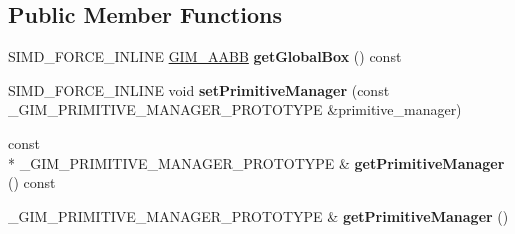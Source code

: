 \subsection*{Public Member Functions}
\begin{DoxyCompactItemize}
\item 
\hypertarget{class_g_i_m___b_o_x___t_r_e_e___t_e_m_p_l_a_t_e___s_e_t_a3a9763f3f80779ca066ffe3eb449f2a5}{S\+I\+M\+D\+\_\+\+F\+O\+R\+C\+E\+\_\+\+I\+N\+L\+I\+N\+E \hyperlink{class_g_i_m___a_a_b_b}{G\+I\+M\+\_\+\+A\+A\+B\+B} {\bfseries get\+Global\+Box} () const }\label{class_g_i_m___b_o_x___t_r_e_e___t_e_m_p_l_a_t_e___s_e_t_a3a9763f3f80779ca066ffe3eb449f2a5}

\item 
\hypertarget{class_g_i_m___b_o_x___t_r_e_e___t_e_m_p_l_a_t_e___s_e_t_a6830317f605b98492bc09426a5e6e1ee}{S\+I\+M\+D\+\_\+\+F\+O\+R\+C\+E\+\_\+\+I\+N\+L\+I\+N\+E void {\bfseries set\+Primitive\+Manager} (const \+\_\+\+G\+I\+M\+\_\+\+P\+R\+I\+M\+I\+T\+I\+V\+E\+\_\+\+M\+A\+N\+A\+G\+E\+R\+\_\+\+P\+R\+O\+T\+O\+T\+Y\+P\+E \&primitive\+\_\+manager)}\label{class_g_i_m___b_o_x___t_r_e_e___t_e_m_p_l_a_t_e___s_e_t_a6830317f605b98492bc09426a5e6e1ee}

\item 
\hypertarget{class_g_i_m___b_o_x___t_r_e_e___t_e_m_p_l_a_t_e___s_e_t_a34168d73831d07432998880202eac548}{const \\*
\+\_\+\+G\+I\+M\+\_\+\+P\+R\+I\+M\+I\+T\+I\+V\+E\+\_\+\+M\+A\+N\+A\+G\+E\+R\+\_\+\+P\+R\+O\+T\+O\+T\+Y\+P\+E \& {\bfseries get\+Primitive\+Manager} () const }\label{class_g_i_m___b_o_x___t_r_e_e___t_e_m_p_l_a_t_e___s_e_t_a34168d73831d07432998880202eac548}

\item 
\hypertarget{class_g_i_m___b_o_x___t_r_e_e___t_e_m_p_l_a_t_e___s_e_t_aa4484dfef41de1058825308d8a19e025}{\+\_\+\+G\+I\+M\+\_\+\+P\+R\+I\+M\+I\+T\+I\+V\+E\+\_\+\+M\+A\+N\+A\+G\+E\+R\+\_\+\+P\+R\+O\+T\+O\+T\+Y\+P\+E \& {\bfseries get\+Primitive\+Manager} ()}\label{class_g_i_m___b_o_x___t_r_e_e___t_e_m_p_l_a_t_e___s_e_t_aa4484dfef41de1058825308d8a19e025}

\end{DoxyCompactItemize}
{\bf }\par
